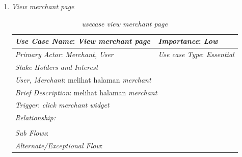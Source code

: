 \documentclass[a4paper]{article}
\begin{document}
\begin{enumerate}
\begin{enumerate}
        \item \textit{View merchant page}
\begin{table}[h]
    \centering
    \begin{tabular}{|lll}
    \hline
    \multicolumn{1}{|l|}{\textit{Use Case Name}: \textit{View merchant page}}             & \multicolumn{2}{l|}{\textit{Importance}: \textit{Low}}   \\ \hline
    \multicolumn{1}{|l|}{\textit{Primary Actor}: \textit{Merchant, User}}             & \multicolumn{2}{l|}{\textit{Use case Type}: \textit{Essential}} \\ \hline
    \multicolumn{1}{|l|}{\textit{Stake Holders and Interest}} &                               &                               \\ \cline{1-1}
    \multicolumn{1}{|l|}{\textit{User, Merchant}: melihat halaman \textit{merchant}}                                                     &                               &                               \\ \hline
    \multicolumn{3}{|l|}{\textit{Brief Description}: melihat halaman \textit{merchant}}                                                                         \\ \hline
    \multicolumn{3}{|l|}{\textit{Trigger}: \textit{click merchant widget}}                                                                                   \\ \hline
    \multicolumn{3}{|l|}{\textit{Relationship:}}                                                                              \\ \hline
    \multicolumn{3}{|l|}{}                                                                                                                     \\ \hline
    \multicolumn{3}{|l|}{\textit{Sub Flows}:}                                                                                 \\ \hline
    \multicolumn{3}{|l|}{\textit{Alternate/Exceptional Flow}:}                                                                \\ \hline
    \end{tabular}
    \caption{\textit{usecase view merchant page} }
\end{table}


\end{enumerate}
\end{enumerate}
\end{document}
